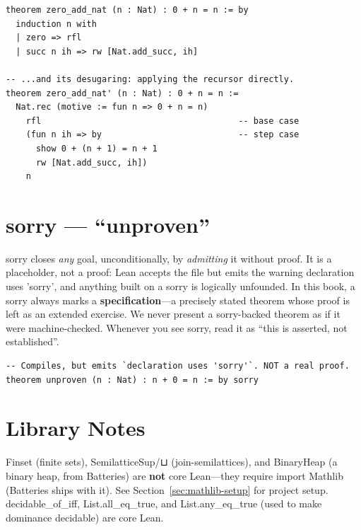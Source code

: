 \documentclass[11pt, a4paper, oneside]{book}
\newcommand{\li}[1]{{\ttfamily\small\color{deepblue}#1}}
\begin{document}
\begin{leanbox}
\begin{verbatim}
theorem zero_add_nat (n : Nat) : 0 + n = n := by
  induction n with
  | zero => rfl
  | succ n ih => rw [Nat.add_succ, ih]

-- ...and its desugaring: applying the recursor directly.
theorem zero_add_nat' (n : Nat) : 0 + n = n :=
  Nat.rec (motive := fun n => 0 + n = n)
    rfl                                       -- base case
    (fun n ih => by                           -- step case
      show 0 + (n + 1) = n + 1
      rw [Nat.add_succ, ih])
    n
\end{verbatim}
\end{leanbox}

\section{\texorpdfstring{\li{sorry}}{sorry} --- ``unproven''}

\begin{warningbox}
\li{sorry} closes \emph{any} goal, unconditionally, by \emph{admitting} it
without proof.  It is a placeholder, not a proof: Lean accepts the file but emits
the warning \li{declaration uses 'sorry'}, and anything built on a \li{sorry} is
logically unfounded.  In this book, a \li{sorry} always marks a
\textbf{specification}---a precisely stated theorem whose proof is left as an
extended exercise.  We never present a \li{sorry}-backed theorem as if it were
machine-checked.  Whenever you see \li{sorry}, read it as ``this is asserted, not
established''.
\end{warningbox}

\begin{leanbox}
\begin{verbatim}
-- Compiles, but emits `declaration uses 'sorry'`. NOT a real proof.
theorem unproven (n : Nat) : n + 0 = n := by sorry
\end{verbatim}
\end{leanbox}

\section{Library Notes}

\li{Finset} (finite sets), \li{SemilatticeSup}/\li{⊔} (join-semilattices), and
\li{BinaryHeap} (a binary heap, from Batteries) are \textbf{not} core Lean---they
require \li{import Mathlib} (Batteries ships with it).  See
Section~\ref{sec:mathlib-setup} for project setup.  \li{decidable\_of\_iff},
\li{List.all\_eq\_true}, and \li{List.any\_eq\_true} (used to make dominance
decidable) are core Lean.

\end{document}
